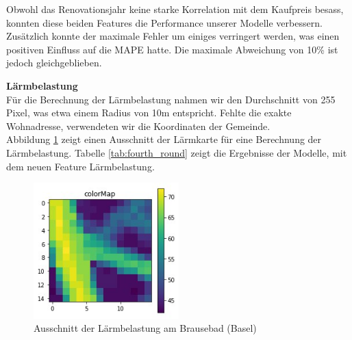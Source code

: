 \begin{table}[ht]
\centering
{}
\caption{Ergebnisse mit Einbezug der Renovation}
\label{tab:third_round}
\end{table}

Obwohl das Renovationsjahr keine starke Korrelation mit dem Kaufpreis besass, konnten diese beiden Features die Performance unserer Modelle verbessern. Zusätzlich konnte der maximale Fehler um einiges verringert werden, was einen positiven Einfluss auf die MAPE hatte. Die maximale Abweichung von 10\% ist jedoch gleichgeblieben.

\textbf{Lärmbelastung}\\
Für die Berechnung der Lärmbelastung nahmen wir den Durchschnitt von 255 Pixel, was etwa einem Radius von 10m entspricht. Fehlte die exakte Wohnadresse, verwendeten wir die Koordinaten der Gemeinde.\\
Abbildung \ref{fig:noise} zeigt einen Ausschnitt der Lärmkarte für eine Berechnung der Lärmbelastung. Tabelle \ref{tab:fourth_round} zeigt die Ergebnisse der Modelle, mit dem neuen Feature Lärmbelastung.

\begin{figure}[ht]
\centering
\includegraphics[width=0.5\textwidth]{images/noise.jpeg}
\caption[Ausschnitt der Lärmbelastung am Brausebad (Basel)]{Ausschnitt der Lärmbelastung am Brausebad (Basel)}
\label{fig:noise}
\end{figure}

